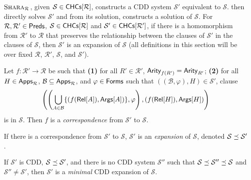 $\textsc{Shara}_{ \mathcal{R} }$, given $\mathcal{S} \in \mathsf{CHCs}[  \mathcal{R}  ]$,
constructs a CDD system $\mathcal{S'}$ equivalent to $\mathcal{S}$.
%
\sys then directly solves $\mathcal{S'}$ and from its solution,
constructs a solution of $\mathcal{S}$.
For $\mathcal{R}, \mathcal{R}' \in \mathsf{Preds}$, $\mathcal{S} \in \mathsf{CHCs}[ 
  \mathcal{R}  ]$ and $\mathcal{S}' \in \mathsf{CHCs}[  \mathcal{R}'  ]$, if
there is a homomorphism from $\mathcal{R}'$ to $\mathcal{R}$ that
preserves the relationship between the clauses of $\mathcal{S}'$ in
the clauses of $\mathcal{S}$, then $\mathcal{S}'$ is an expansion of
$\mathcal{S}$ (all definitions in this section will be over fixed
$\mathcal{R}$, $\mathcal{R}'$, $\mathcal{S}$, and $\mathcal{S}'$).
\begin{defn}
  \label{defn:expansion}
  Let $f : \mathcal{R}' \to \mathcal{R}$ be such that
  \textbf{(1)} for all $R' \in \mathcal{R}'$, $\mathsf{Arity}_{f(R')} =
  \mathsf{Arity}_{R'}$;
  \textbf{(2)} for all $H \in \mathsf{Apps}_{\mathcal{R}}$, $\mathcal{B}
  \subseteq \mathsf{Apps}_{ \mathcal{R} }$, and $\varphi \in \mathsf{Forms}$ such
  that $((\mathcal{B}, \varphi), H) \in \mathcal{S}'$, clause
  \[ \left( \left( \bigunion_{ A \in \mathcal{B} } %
        \{ (f(\relof{A}), \argsof{A}) \}, \varphi \right), %
      ( f(\relof{H}), \argsof{H} ) \right)
  \]
  is in $\mathcal{S}$.
  Then $f$ is a \emph{correspondence} from $\mathcal{S}'$ to
  $\mathcal{S}$.
\end{defn}
%
If there is a correspondence from $\mathcal{S}'$ to $\mathcal{S}$,
$\mathcal{S}'$ is an \emph{expansion} of $\mathcal{S}$, denoted
$\mathcal{S} \preceq \mathcal{S}'$.
%
\begin{defn}
  \label{defn:min-cdd-expansion}
  If $\mathcal{S}'$ is CDD, %
  $\mathcal{S} \preceq \mathcal{S}'$, and %
  there is no CDD system $\mathcal{S}''$ such that $\mathcal{S}
  \preceq \mathcal{S}'' \preceq \mathcal{S}$ and $\mathcal{S}''
  \not= \mathcal{S}'$, then $\mathcal{S}'$ is a \emph{minimal} CDD
  expansion of $\mathcal{S}$.
\end{defn}

